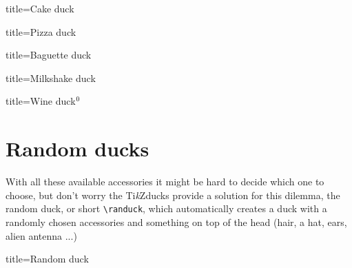 \documentclass[parskip=half]{scrartcl}
\newcommand{\tikzducks}{Ti\emph{k}Zducks\xspace}
\begin{document}
\begin{tcblisting}{title={Cake duck}}
\begin{tikzpicture}
  \duck[cake=red!50!violet!80!black]
\end{tikzpicture}	
\end{tcblisting}

\begin{tcblisting}{title={Pizza duck}}
\begin{tikzpicture}
  \duck[pizza]
\end{tikzpicture}	
\end{tcblisting}

\begin{tcblisting}{title={Baguette duck}}
\begin{tikzpicture}
  \duck[baguette=brown]
\end{tikzpicture}	
\end{tcblisting}

\begin{tcblisting}{title={Milkshake duck}}
\begin{tikzpicture}
	\duck[milkshake=red!20!white]
\end{tikzpicture}	
\end{tcblisting}

\addtocounter{footnote}{1}
\begin{tcblisting}{title={Wine duck$^\thefootnote$}}
\begin{tikzpicture}
	\duck[wine=red!70!black]
\end{tikzpicture}
\end{tcblisting}

\section{Random ducks}
With all these available accessories it might be hard to decide which one to choose, but don't worry the \tikzducks provide a solution for this dilemma, the random duck, or short \lstinline|\randuck|, which automatically creates a duck with a randomly chosen accessories and something on top of the head (hair, a hat, ears, alien antenna ...)

\begin{tcblisting}{title={Random duck}}
\begin{tikzpicture}
	\randuck
\end{tikzpicture}
\end{tcblisting}
\end{document}
